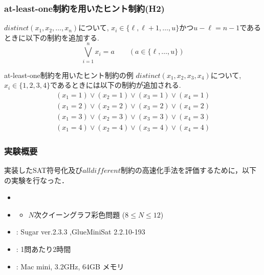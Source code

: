 \documentclass [dvipdfmx,11pt]{beamer}
\newcommand{\alldifferent}{$alldifferent$}
\begin{document}
\begin{frame}
    \frametitle{at-least-one制約を用いたヒント制約(H2)}
    \vspace{-3mm}
    \begin{block}{}
        $distinct(x_1,x_2,\ldots,x_n)$について, $x_i \in \{\ell, \ell+1,\ldots, u\}$かつ$u-\ell=n-1$であるときに以下の制約を追加する.\\
        \vspace{-3mm}
        $$\bigvee_{i=1}^n x_i=a \qquad (a \in \{\ell,\ldots, u\})$$
    \end{block}
    \begin{exampleblock}{at-least-one制約を用いたヒント制約の例}
        $distinct(x_1, x_2, x_3, x_4)$について, $x_i \in \{1, 2, 3, 4\}$であるときには以下の制約が追加される.
        \vspace{-3mm}
        \begin{eqnarray*}
            (x_1=1) \lor (x_2=1) \lor (x_3=1) \lor (x_4=1)\\
            (x_1=2) \lor (x_2=2) \lor (x_3=2) \lor (x_4=2)\\
            (x_1=3) \lor (x_2=3) \lor (x_3=3) \lor (x_4=3)\\
            (x_1=4) \lor (x_2=4) \lor (x_3=4) \lor (x_4=4)
        \end{eqnarray*}

    \end{exampleblock}
\end{frame}



\begin{frame}
    \frametitle{実験概要}
    実装したSAT符号化及び{\alldifferent}制約の高速化手法を評価するために，以下の実験を行なった．
    \begin{itemize}
        \item {}
        \item {}
            \begin{itemize}
                \item $N$次クイーングラフ彩色問題 ($8\leq N\leq 12$)
            \end{itemize}
        \item {}: Sugar ver.2.3.3 ,GlueMiniSat 2.2.10-193
        \item {}: 1問あたり2時間
        \item {}: Mac mini, 3.2GHz, 64GB メモリ
    \end{itemize}
\end{frame}
\end{document}
